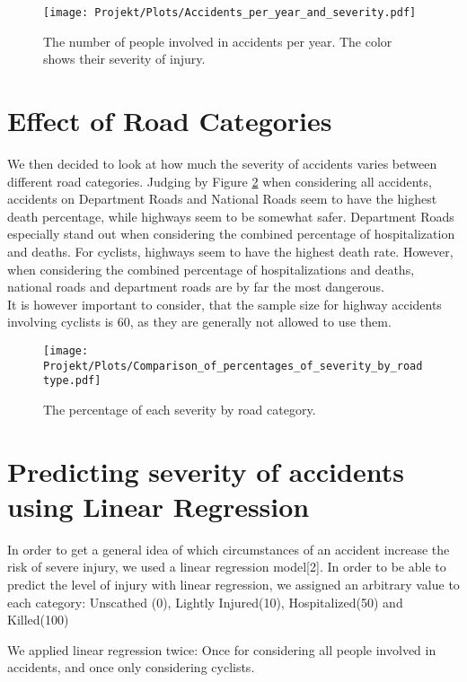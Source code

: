 \documentclass{article}
\begin{document}
\begin{figure}
  \centering
  \texttt{[image: Projekt/Plots/Accidents\_per\_year\_and\_severity.pdf]}
  \caption{The number of people involved in accidents per year. The color shows their severity of injury.}
  \label{plot:severity1}
\end{figure}

\section{Effect of Road Categories}

We then decided to look at how much the severity of accidents varies between different road categories. Judging by Figure \ref{plot:severity_road} when considering all accidents, accidents on Department Roads and National Roads seem to have the highest death percentage, while highways seem to be somewhat safer. Department Roads especially stand out when considering the combined percentage of hospitalization and deaths. For cyclists, highways seem to have the highest death rate.
However, when considering the combined percentage of hospitalizations and deaths, national roads and department roads are by far the most dangerous.\\

It is however important to consider, that the sample size for highway accidents involving cyclists is 60, as they are generally not allowed to use them. 

\begin{figure}
  \centering
  \texttt{[image: Projekt/Plots/Comparison\_of\_percentages\_of\_severity\_by\_roadtype.pdf]}
  \caption{The percentage of each severity by road category.}
  \label{plot:severity_road}
\end{figure}


\section{Predicting severity of accidents using Linear Regression}

In order to get a general idea of which circumstances of an accident increase the risk of severe injury, we used a linear regression model[2]. In order to be able to predict the level of injury with linear regression, we assigned an arbitrary value to each category:
Unscathed (0), Lightly Injured(10), Hospitalized(50) and Killed(100)

We applied linear regression twice: Once for considering all people involved in accidents, and once only considering cyclists.
\end{document}
